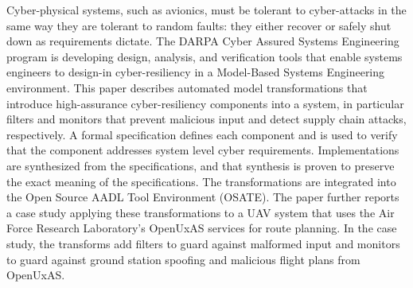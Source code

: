 Cyber-physical systems, such as avionics, must be tolerant to cyber-attacks in the same way they are tolerant to random faults: they either recover or safely shut down as requirements dictate. The DARPA Cyber Assured Systems Engineering program is developing design, analysis, and verification tools that enable systems engineers to design-in cyber-resiliency in a Model-Based Systems Engineering environment. This paper describes automated model transformations that introduce  high-assurance cyber-resiliency components into a system, in particular filters and monitors that prevent malicious input and detect supply chain attacks, respectively. A formal specification defines each component and is used to verify that the component addresses system level cyber requirements. Implementations are synthesized from the specifications, and that synthesis is proven to preserve the exact meaning of the specifications. The transformations are integrated into the Open Source AADL Tool Environment (OSATE). The paper further reports a case study applying these transformations to a UAV system that uses the Air Force Research Laboratory's OpenUxAS services for route planning. In the case study, the transforms add filters to guard against malformed input and monitors to guard against ground station spoofing and malicious flight plans from OpenUxAS.
